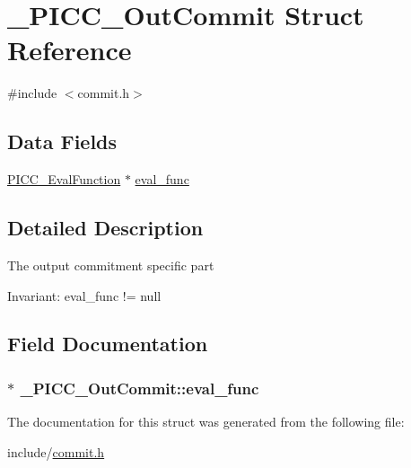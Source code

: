 \hypertarget{struct__PICC__OutCommit}{\section{\-\_\-\-P\-I\-C\-C\-\_\-\-Out\-Commit Struct Reference}
\label{struct__PICC__OutCommit}
}


{\ttfamily \#include $<$commit.\-h$>$}

\subsection*{Data Fields}
{\bf }\par
\begin{DoxyCompactItemize}
\item 
\hyperlink{commit_8h_ad2bb1ba499a64c4eb87962523a3957ab}{P\-I\-C\-C\-\_\-\-Eval\-Function} $\ast$ \hyperlink{struct__PICC__OutCommit_a598ca6a884ab33ac8e18a2236d19da5b}{eval\-\_\-func}
\end{DoxyCompactItemize}



\subsection{Detailed Description}
The output commitment specific part \begin{DoxyParagraph}{Invariant\-:}
eval\-\_\-func != null 
\end{DoxyParagraph}


\subsection{Field Documentation}
\hypertarget{struct__PICC__OutCommit_a598ca6a884ab33ac8e18a2236d19da5b}{
\subsubsection[{eval\-\_\-func}]{$\ast$ \-\_\-\-P\-I\-C\-C\-\_\-\-Out\-Commit\-::eval\-\_\-func}}\label{struct__PICC__OutCommit_a598ca6a884ab33ac8e18a2236d19da5b}


The documentation for this struct was generated from the following file\-:\begin{DoxyCompactItemize}
\item 
include/\hyperlink{commit_8h}{commit.\-h}\end{DoxyCompactItemize}
